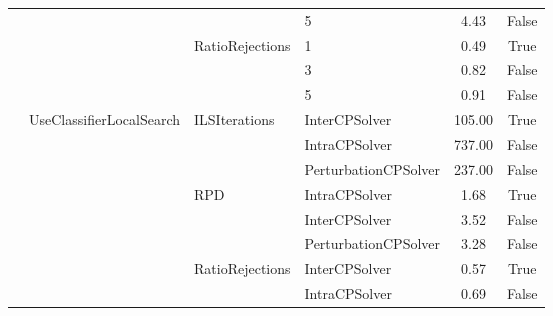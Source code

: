 \begin{table}[!ht]
\begin{tabular}{@{}l|l|l|l|c|c @{}}
		                                   &                                           &                                  & 5                    & 4.43            & False           \\\cline{3-6}
		                                   &                                           & \multirow{3}{*}{RatioRejections} & 1                    & 0.49            & True            \\\cline{4-6}
		                                   &                                           &                                  & 3                    & 0.82            & False           \\\cline{4-6}
		                                   &                                           &                                  & 5                    & 0.91            & False           \\\cline{2-6}
		                                   & \multirow{9}{*}{UseClassifierLocalSearch} & \multirow{3}{*}{ILSIterations}   & InterCPSolver        & 105.00          & True            \\\cline{4-6}
		                                   &                                           &                                  & IntraCPSolver        & 737.00          & False           \\\cline{4-6}
		                                   &                                           &                                  & PerturbationCPSolver & 237.00          & False           \\\cline{3-6}
		                                   &                                           & \multirow{3}{*}{RPD}             & IntraCPSolver        & 1.68            & True            \\\cline{4-6}
		                                   &                                           &                                  & InterCPSolver        & 3.52            & False           \\\cline{4-6}
		                                   &                                           &                                  & PerturbationCPSolver & 3.28            & False           \\\cline{3-6}
		                                   &                                           & \multirow{3}{*}{RatioRejections} & InterCPSolver        & 0.57            & True            \\\cline{4-6}
		                                   &                                           &                                  & IntraCPSolver        & 0.69            & False           \\\cline{4-6}

\end{tabular}
\end{table}
